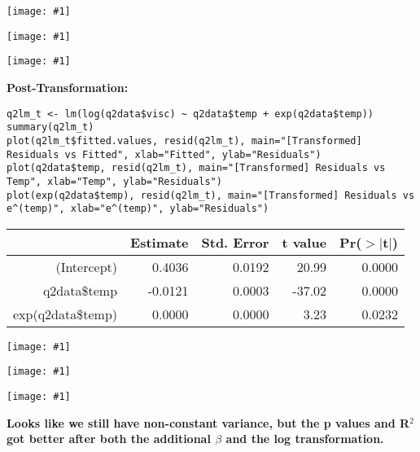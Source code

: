 \documentclass{article}
\newcommand{\mt}[1]{\ensuremath{#1}}
\newcommand{\bta}{\mt{\beta} }
\newcommand{\simg}[1]{
  \texttt{[image: \#1]}
}
\begin{document}
{{\simg{HW6Q2PC1}
\simg{HW6Q2PC2}
\simg{HW6Q2PC3}

\textbf{Post-Transformation:}

\begin{verbatim}
q2lm_t <- lm(log(q2data$visc) ~ q2data$temp + exp(q2data$temp))
summary(q2lm_t)
plot(q2lm_t$fitted.values, resid(q2lm_t), main="[Transformed] Residuals vs Fitted", xlab="Fitted", ylab="Residuals")
plot(q2data$temp, resid(q2lm_t), main="[Transformed] Residuals vs Temp", xlab="Temp", ylab="Residuals")
plot(exp(q2data$temp), resid(q2lm_t), main="[Transformed] Residuals vs e^(temp)", xlab="e^(temp)", ylab="Residuals")
\end{verbatim}

\begin{table}[ht]
\centering
\begin{tabular}{rrrrr}
  \hline
 & Estimate & Std. Error & t value & Pr($>$$|$t$|$) \\ 
  \hline
(Intercept) & 0.4036 & 0.0192 & 20.99 & 0.0000 \\ 
  q2data\$temp & -0.0121 & 0.0003 & -37.02 & 0.0000 \\ 
  exp(q2data\$temp) & 0.0000 & 0.0000 & 3.23 & 0.0232 \\ 
   \hline
\end{tabular}
\end{table}

\simg{HW6Q2PC4}
\simg{HW6Q2PC5}
\simg{HW6Q2PC6}

\textbf{Looks like we still have non-constant variance, but the p values and R$^2$ got better after both the additional \bta and the log transformation.}

}
}

\newpage
\end{document}
